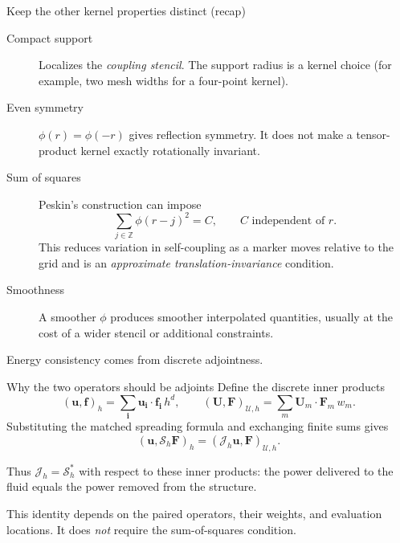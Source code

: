 \documentclass[aspectratio=169,11pt]{beamer}
\newcommand{\uvec}{\bm{u}}
\newcommand{\Uvec}{\bm{U}}
\newcommand{\fvec}{\bm{f}}
\newcommand{\Fvec}{\bm{F}}
\begin{document}
\begin{frame}{Keep the other kernel properties distinct (recap)}
\small
{}
\begin{description}
  \item[Compact support] Localizes the \emph{coupling stencil}. The support radius is a kernel choice (for example, two mesh widths for a four-point kernel).
  \item[Even symmetry] \(\phi(r)=\phi(-r)\) gives reflection symmetry. It does not make a tensor-product kernel exactly rotationally invariant.
  \item[Sum of squares] Peskin's construction can impose
  \[
    \sum_{j\in\mathbb Z}\phi(r-j)^2=C,
    \qquad C\text{ independent of }r.
  \]
  This reduces variation in self-coupling as a marker moves relative to the grid and is an \emph{approximate translation-invariance} condition.
  \item[Smoothness] A smoother \(\phi\) produces smoother interpolated quantities, usually at the cost of a wider stencil or additional constraints.
\end{description}

\begin{punchbox}
 Energy consistency comes from discrete adjointness.
\end{punchbox}
\end{frame}

\begin{frame}{Why the two operators should be adjoints}
Define the discrete inner products
\[
  (\uvec,\fvec)_h
  =\sum_{\bm{i}}\uvec_{\bm{i}}\cdot\fvec_{\bm{i}}\,h^d,
  \qquad
  (\Uvec,\Fvec)_{\mathcal U,h}
  =\sum_m\Uvec_m\cdot\Fvec_m\,w_m.
\]
Substituting the matched spreading formula and exchanging finite sums gives
\[
  \boxed{
  (\uvec,\mathcal S_h\Fvec)_h
  =(\mathcal J_h\uvec,\Fvec)_{\mathcal U,h}.}
\]

\begin{punchbox}
\centering
Thus \(\mathcal J_h=\mathcal S_h^{*}\) with respect to these inner products: the power delivered to the fluid equals the power removed from the structure.
\end{punchbox}

\medskip
This identity depends on the paired operators, their weights, and evaluation locations. It does \emph{not} require the sum-of-squares condition.
\end{frame}
\end{document}
